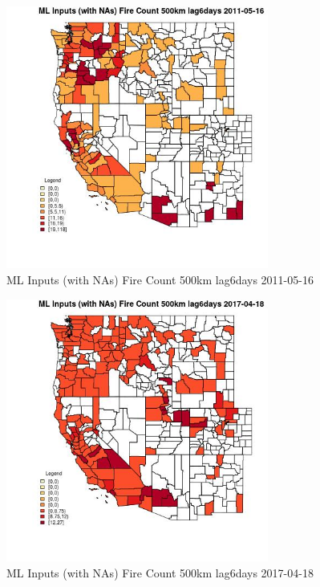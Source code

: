 \begin{figure} 
\centering  
\includegraphics[width=0.77\textwidth]{Code_Outputs/Report_ML_input_PM25_Step4_part_e_de_duplicated_aves_compiled_2019-05-20wNAs_CountyFire_Count_500km_lag6daysMean2011-05-16.jpg} 
\caption{\label{fig:Report_ML_input_PM25_Step4_part_e_de_duplicated_aves_compiled_2019-05-20wNAsCountyFire_Count_500km_lag6daysMean2011-05-16}ML Inputs (with NAs) Fire Count 500km lag6days 2011-05-16} 
\end{figure} 
 

\begin{figure} 
\centering  
\includegraphics[width=0.77\textwidth]{Code_Outputs/Report_ML_input_PM25_Step4_part_e_de_duplicated_aves_compiled_2019-05-20wNAs_CountyFire_Count_500km_lag6daysMean2017-04-18.jpg} 
\caption{\label{fig:Report_ML_input_PM25_Step4_part_e_de_duplicated_aves_compiled_2019-05-20wNAsCountyFire_Count_500km_lag6daysMean2017-04-18}ML Inputs (with NAs) Fire Count 500km lag6days 2017-04-18} 
\end{figure} 
 

